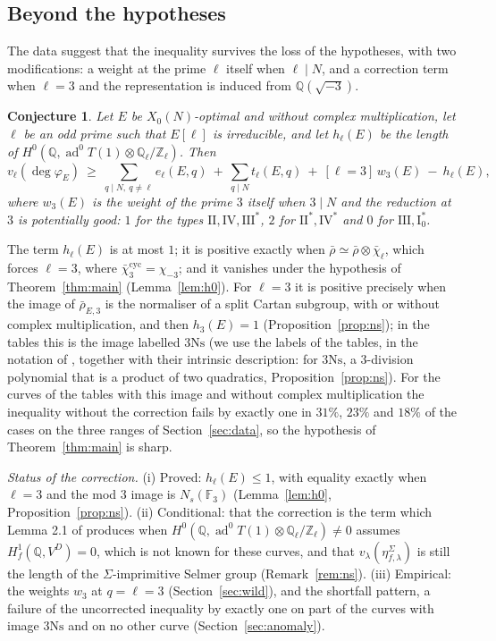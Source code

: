 \documentclass[11pt]{amsart}
\newtheorem{conjecture}[theorem]{Conjecture}
\theoremstyle{definition}
\newcommand{\Q}{\mathbb{Q}}
\newcommand{\Z}{\mathbb{Z}}
\newcommand{\F}{\mathbb{F}}
\newcommand{\degphi}{\deg\varphi_E}
\newcommand{\ad}{\operatorname{ad}^0}
\newcommand{\Ns}{3\mathrm{Ns}}
\newcommand{\cyc}{\mathrm{cyc}}
\begin{document}
\subsection{Beyond the hypotheses}
The data suggest that the inequality survives the loss of the hypotheses, with two modifications: a weight at the prime $\ell$ itself when $\ell\mid N$, and a correction term when $\ell=3$ and the representation is induced from $\Q(\sqrt{-3})$.

\begin{conjecture}\label{conj:euler}
Let $E$ be $X_0(N)$-optimal and without complex multiplication, let $\ell$ be an odd prime such that $E[\ell]$ is irreducible, and let $h_\ell(E)$ be the length of $H^0(\Q,\ad T(1)\otimes\Q_\ell/\Z_\ell)$. Then
\begin{equation}\label{eq:rule}
v_\ell(\degphi)\ \ge\ \sum_{q\mid N,\ q\ne\ell}e_\ell(E,q)\ +\ \sum_{q\mid N}t_\ell(E,q)\ +\ [\ell=3]\,w_3(E)\ -\ h_\ell(E),
\end{equation}
where $w_3(E)$ is the weight of the prime $3$ itself when $3\mid N$ and the reduction at $3$ is potentially good: $1$ for the types $\mathrm{II},\mathrm{IV},\mathrm{III}^*$, $2$ for $\mathrm{II}^*,\mathrm{IV}^*$ and $0$ for $\mathrm{III},\mathrm{I}_0^*$.
\end{conjecture}

The term $h_\ell(E)$ is at most $1$; it is positive exactly when $\bar\rho\simeq\bar\rho\otimes\bar\chi_\ell$, which forces $\ell=3$, where $\bar\chi_3^{\cyc}=\chi_{-3}$; and it vanishes under the hypothesis of Theorem~\ref{thm:main} (Lemma~\ref{lem:h0}). For $\ell=3$ it is positive precisely when the image of $\bar\rho_{E,3}$ is the normaliser of a split Cartan subgroup, with or without complex multiplication, and then $h_3(E)=1$ (Proposition~\ref{prop:ns}); in the tables this is the image labelled $\Ns$ (we use the labels of the tables, in the notation of \cite{Sutherland16}, together with their intrinsic description: for $\Ns$, a $3$-division polynomial that is a product of two quadratics, Proposition~\ref{prop:ns}). For the curves of the tables with this image and without complex multiplication the inequality without the correction fails by exactly one in $31\%$, $23\%$ and $18\%$ of the cases on the three ranges of Section~\ref{sec:data}, so the hypothesis of Theorem~\ref{thm:main} is sharp.

\emph{Status of the correction.} (i) Proved: $h_\ell(E)\le1$, with equality exactly when $\ell=3$ and the mod $3$ image is $N_s(\F_3)$ (Lemma~\ref{lem:h0}, Proposition~\ref{prop:ns}). (ii) Conditional: that the correction is the term which Lemma 2.1 of \cite{DFG04} produces when $H^0(\Q,\ad T(1)\otimes\Q_\ell/\Z_\ell)\ne0$ assumes $H^1_f(\Q,V^D)=0$, which is not known for these curves, and that $v_\lambda(\eta^\Sigma_{f,\lambda})$ is still the length of the $\Sigma$-imprimitive Selmer group (Remark~\ref{rem:ns}). (iii) Empirical: the weights $w_3$ at $q=\ell=3$ (Section~\ref{sec:wild}), and the shortfall pattern, a failure of the uncorrected inequality by exactly one on part of the curves with image $\Ns$ and on no other curve (Section~\ref{sec:anomaly}).
\end{document}
